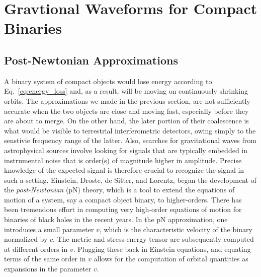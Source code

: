 \section{Gravtional Waveforms for Compact Binaries}
\subsection{Post-{N}ewtonian Approximations}
\label{sec:PNWaveforms}

A binary system of compact objects would lose energy according to 
Eq.~\ref{eq:energy_loss} and, as a result, will be moving on continuously
shrinking orbits. The approximations we made in the previous section, are not 
sufficiently accurate when the two objects are close and moving fast, 
especially before they are about to merge. On the 
other hand, the later portion of their coalescence is what would be visible 
to terrestrial interferometric detectors, owing simply to the senstivie 
frequency range of the latter. Also, searches for gravitational waves from 
astrophysical sources involve looking for signals that are typically embedded
in instrumental noise that is order(s) of magnitude higher in amplitude. 
Precise knowledge of the expected signal is therefore crucial to recognize 
the signal in such a setting. Einstein, Droste, de Sitter, and Lorentz,
began the development of the {\it post-Newtonian} (pN) theory, which is a
tool to extend the equations of motion of a system, say a compact object 
binary, to higher-orders. There has been tremendous effort in computing 
very high-order equations of motion for binaries of black holes in the
recent years. In the pN approximation, one introduces a small parameter 
$v$, which is the characteristic velocity of the binary normalized by $c$.
The metric and
stress energy tensor are subsequently computed at different orders in 
$v$. Plugging these back in Einstein equations, and equating terms of 
the same order in $v$ allows for the computation of orbital quantities
as expansions in the parameter $v$. 



